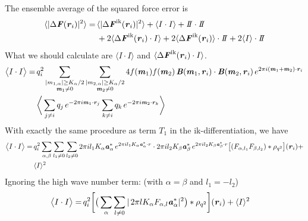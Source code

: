 \documentclass[aps,pre,preprint]{revtex4}
\renewcommand{\v}[1]{\textbf{\textit{#1}}}
\begin{document}
The ensemble average of the squared force error is
\begin{align}\nonumber
  \langle\vert \Delta\v F(\v r_i) \vert^2\rangle
  = &\,
  \langle\vert \Delta\v F^{\textrm{ik}}(\v r_i) \vert^2\rangle
  + \langle I\cdot I\rangle
  + I\negthickspace I\cdot I\negthickspace I\\
  &\,
  + 2\langle\Delta\v F^{\textrm{ik}}(\v r_i)\cdot I\rangle
  + 2\langle\Delta\v F^{\textrm{ik}}(\v r_i)\rangle\cdot I\negthickspace I
  + 2\langle I\rangle\cdot I\negthickspace I
\end{align}
What we should calculate are $\langle I\cdot I\rangle$ and
$\langle\Delta\v F^{\textrm{ik}}(\v r_i)\cdot I\rangle$.
\begin{align}\nonumber
  \big\langle
  I\cdot I
  \big\rangle
  = \,&
  q^2_i
  \sum_{
    \begin{subarray}{c}
      \vert m_{1,\alpha}\vert \geq K_\alpha/2\\
      \v m_1\neq 0
    \end{subarray}}
  \sum_{
    \begin{subarray}{c}
      \vert m_{2,\alpha}\vert \geq K_\alpha/2\\
      \v m_2\neq 0
    \end{subarray}}
  4 f(\v m_1)f(\v m_2) \,
  \v B(\v m_1, \v r_i)\cdot\v B(\v m_2, \v r_i)
  \,e^{2\pi i(\v m_1 + \v m_2)\cdot\v r_i} \\ 
  &
  \bigg\langle
  \sum_{j\neq i}q_j\,e^{-2\pi i\v m_1\cdot\v r_j}  
  \sum_{k\neq i}q_k\,e^{-2\pi i\v m_2\cdot\v r_k}
  \bigg\rangle
\end{align}
With exactly the same procedure as term $T_1$ in the
ik-differentiation, we have
\begin{align}\nonumber
  \big\langle
  I\cdot I
  \big\rangle
  = &\, 
  q_i^2
  \sum_{\alpha, \beta}\sum_{l_1\neq 0}\sum_{l_2\neq 0}
  2\pi i l_1K_\alpha\v a_\alpha^\ast\,e^{2\pi i l_1 K_\alpha\v a_\alpha^\ast\cdot r}
  \cdot
  2\pi i l_2K_\beta \v a_\beta ^\ast\,e^{2\pi i l_2 K_\beta \v a_\beta^\ast\cdot r}
  \big[
  (F_{\alpha,l_1} F_{\beta,l_2})
  \ast \rho_{q^2}
  \big]
  (\v r_i) + \\
  &\,
  \langle I\rangle^2
\end{align}
Ignoring the high wave number term: (with $\alpha = \beta$ and $l_1 = -l_2$)
\begin{align}\nonumber
  \big\langle
  I\cdot I
  \big\rangle
  = &\, 
  q_i^2
  \bigg[
  \big(
  \sum_{\alpha}\sum_{l\neq 0}
  \vert\,
  2\pi l K_\alpha F_{\alpha,l} \v a_\alpha^\ast\vert^2
  \big)
  \ast \rho_{q^2}
  \bigg]
  (\v r_i) + 
  \langle I\rangle^2
\end{align}
\end{document}
